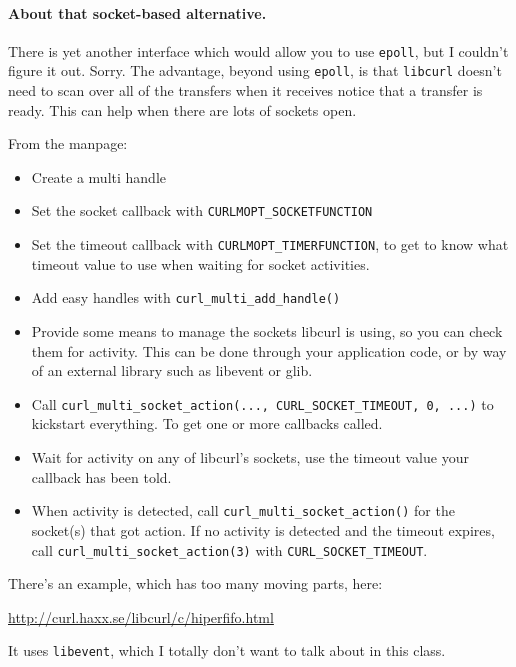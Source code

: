 \paragraph{About that socket-based alternative.} There is yet another interface which
would allow you to use {\tt epoll}, but I couldn't figure it out. Sorry. The advantage,
beyond using {\tt epoll}, is that {\tt libcurl} doesn't need to scan over all of the transfers
when it receives notice that a transfer is ready. This can help when there are lots of sockets
open.

From the manpage:
\begin{itemize}
\item Create a multi handle

\item Set the socket callback with {\tt CURLMOPT\_SOCKETFUNCTION}

\item Set the timeout callback with {\tt CURLMOPT\_TIMERFUNCTION}, to get to know what timeout value to use when waiting for socket activities.

\item Add easy handles with {\tt curl\_multi\_add\_handle()}

\item Provide some means to manage the sockets libcurl is using, so you can check them for activity. This can be done through your application code, or by way of an external library such as libevent or glib.

\item Call {\tt curl\_multi\_socket\_action(..., CURL\_SOCKET\_TIMEOUT, 0, ...)} to kickstart everything. To get one or more callbacks called.

\item Wait for activity on any of libcurl's sockets, use the timeout value your callback has been told.

\item When activity is detected, call {\tt curl\_multi\_socket\_action()} for the socket(s) that got action. If no activity is detected and the timeout expires, call {\tt curl\_multi\_socket\_action(3)} with {\tt CURL\_SOCKET\_TIMEOUT}. 
\end{itemize}
There's an example, which has too many moving parts, here:
\begin{center}
\url{http://curl.haxx.se/libcurl/c/hiperfifo.html}
\end{center}
It uses {\tt libevent}, which I totally don't want to talk about in this class.

